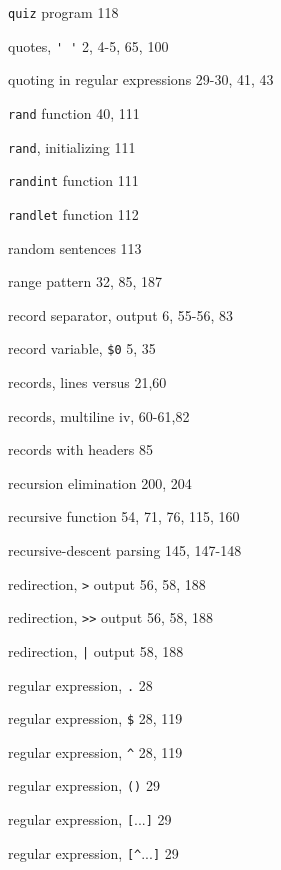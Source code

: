 \begin{multicols}{3}
\hangindent=3pc  \verb'quiz' program 118

\hangindent=3pc  quotes, \verb"' '" 2, 4-5, 65, 100

\hangindent=3pc  quoting in regular expressions 29-30, 41, 43

\hangindent=3pc  \verb'rand' function 40, 111

\hangindent=3pc  \verb'rand', initializing 111

\hangindent=3pc  \verb'randint' function 111

\hangindent=3pc  \verb'randlet' function 112

\hangindent=3pc  random sentences 113

\hangindent=3pc  range pattern 32, 85, 187

\hangindent=3pc  record separator, output 6, 55-56, 83

\hangindent=3pc  record variable, \verb'$0' 5, 35

\hangindent=3pc  records, lines versus 21,60

\hangindent=3pc  records, multiline iv, 60-61,82

\hangindent=3pc  records with headers 85

\hangindent=3pc  recursion elimination 200, 204

\hangindent=3pc  recursive function 54, 71, 76, 115, 160

\hangindent=3pc  recursive-descent parsing 145, 147-148

\hangindent=3pc  redirection, \verb'>' output 56, 58, 188

\hangindent=3pc  redirection, \verb'>>' output 56, 58, 188

\hangindent=3pc  redirection, \verb'|' output 58, 188

\hangindent=3pc  regular expression, \verb'.' 28

\hangindent=3pc  regular expression, \verb'$' 28, 119

\hangindent=3pc  regular expression, \verb'^' 28, 119

\hangindent=3pc  regular expression, \verb'()' 29

\hangindent=3pc  regular expression, \verb'['...\verb']' 29

\hangindent=3pc  regular expression, \verb'[^'...\verb']' 29


\end{multicols}
